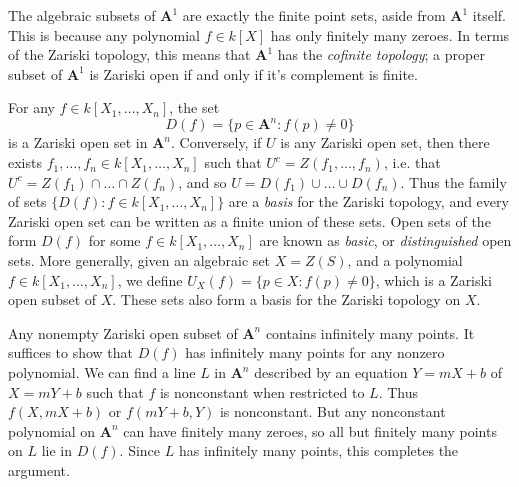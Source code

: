 \begin{example}
    The algebraic subsets of $\mathbf{A}^1$ are exactly the finite point sets, aside from $\mathbf{A}^1$ itself. This is because any polynomial $f \in k[X]$ has only finitely many zeroes. In terms of the Zariski topology, this means that $\mathbf{A}^1$ has the \emph{cofinite topology}; a proper subset of $\mathbf{A}^1$ is Zariski open if and only if it's complement is finite.
\end{example}

For any $f \in k[X_1,\dots,X_n]$, the set
%
\[ D(f) = \{ p \in \mathbf{A}^n: f(p) \neq 0 \} \]
%
is a Zariski open set in $\mathbf{A}^n$. Conversely, if $U$ is any Zariski open set, then there exists $f_1,\dots,f_n \in k[X_1,\dots,X_n]$ such that $U^c = Z(f_1,\dots,f_n)$, i.e. that $U^c = Z(f_1) \cap \dots \cap Z(f_n)$, and so $U = D(f_1) \cup \dots \cup D(f_n)$. Thus the family of sets $\{ D(f): f \in k[X_1,\dots,X_n] \}$ are a \emph{basis} for the Zariski topology, and every Zariski open set can be written as a finite union of these sets. Open sets of the form $D(f)$ for some $f \in k[X_1,\dots,X_n]$ are known as \emph{basic}, or \emph{distinguished} open sets. More generally, given an algebraic set $X = Z(S)$, and a polynomial $f \in k[X_1,\dots,X_n]$, we define $U_X(f) = \{ p \in X : f(p) \neq 0 \}$, which is a Zariski open subset of $X$. These sets also form a basis for the Zariski topology on $X$.

\begin{example}
    Any nonempty Zariski open subset of $\mathbf{A}^n$ contains infinitely many points. It suffices to show that $D(f)$ has infinitely many points for any nonzero polynomial. We can find a line $L$ in $\mathbf{A}^n$ described by an equation $Y = mX + b$ of $X = mY + b$ such that $f$ is nonconstant when restricted to $L$. Thus $f(X,mX + b)$ or $f(mY + b,Y)$ is nonconstant. But any nonconstant polynomial on $\mathbf{A}^n$ can have finitely many zeroes, so all but finitely many points on $L$ lie in $D(f)$. Since $L$ has infinitely many points, this completes the argument.
\end{example}

